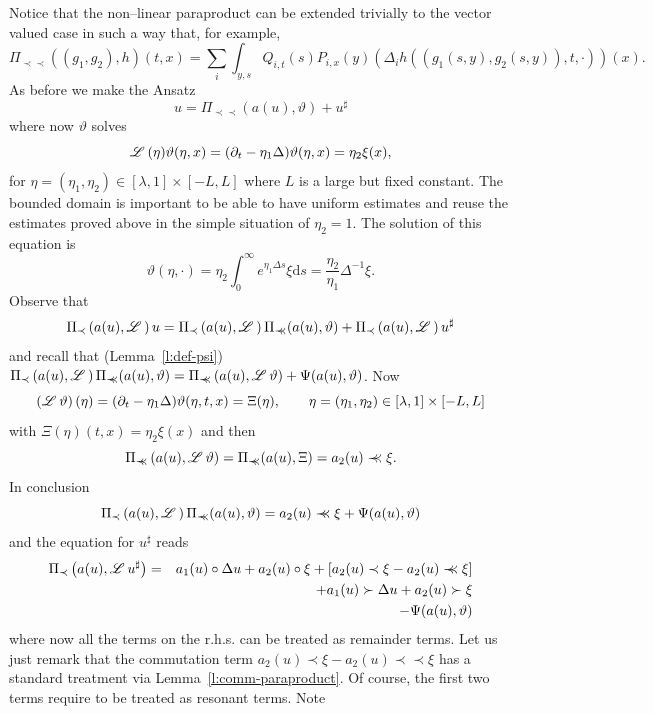 \documentclass[11pt,reqno]{amsart}
\newcommand{\mathd}{\mathrm{d}}
\newcommand{\precprec}{\prec\!\!\!\prec}
\newcommand{\LL}{\mathscr{L} \hspace{.2em}}
\begin{document}
Notice that the non--linear paraproduct can be extended trivially to the
vector valued case in such a way that, for example,
\[ \Pi_{\precprec} ((g_1, g_2), h) (t, x) = \sum_i \int_{y, s} Q_{i, t} (s)
   P_{i, x} (y) (\Delta_i h ((g_1 (s, y), g_2 (s, y)), t, \cdot)) (x) . \]
As before we make the Ansatz
\[ u = \Pi_{\precprec} (a (u), \vartheta) + u^{\sharp} \]
where now $\vartheta$ solves
\[ \LL (\eta) \vartheta (\eta, x) = (\partial_t - \eta_1 \Delta) \vartheta
   (\eta, x) = \eta_2 \xi (x), \]
for $\eta = (\eta_1, \eta_2) \in [\lambda, 1] \times [- L, L]$ where $L$ is a
large but fixed constant. The bounded domain is important to be able to have
uniform estimates and reuse the estimates proved above in the simple situation
of $\eta_2 = 1$. The solution of this equation is
\[ \vartheta (\eta, \cdot) = \eta_2 \int_0^{\infty} e^{\eta_1 \Delta s} \xi
   \mathd s = \frac{\eta_2}{\eta_1} \Delta^{- 1} \xi . \]
Observe that
\[ \Pi_{\prec} \left( a (u), \LL \right) u = \Pi_{\prec} \left( a (u), \LL
   \right) \Pi_{\precprec} (a (u), \vartheta) + \Pi_{\prec} \left( a (u), \LL
   \right) u^{\sharp} \]
and recall that (Lemma~\ref{l:def-psi}) $\Pi_{\prec} \left( a (u), \LL \right)
\Pi_{\precprec} (a (u), \vartheta) = \Pi_{\precprec} \left( a (u), \LL
\vartheta \right) + \Psi (a (u), \vartheta)$. Now
\[ \left( \LL \vartheta \right) (\eta) = (\partial_t - \eta_1 \Delta)
   \vartheta (\eta, t, x) = \Xi (\eta), \qquad \eta = (\eta_1, \eta_2) \in
   [\lambda, 1] \times [- L, L] \]
with $\Xi (\eta) (t, x) = \eta_2 \xi (x)$ and then
\[ \Pi_{\precprec} \left( a (u), \LL \vartheta \right) = \Pi_{\precprec} (a
   (u), \Xi) = a_2 (u) \precprec \xi . \]
In conclusion
\[ \Pi_{\prec} \left( a (u), \LL \right) \Pi_{\precprec} (a (u), \vartheta) =
   a_2 (u) \precprec \xi + \Psi (a (u), \vartheta) \]
and the equation for $u^{\sharp}$ reads
\begin{eqnarray}
  \Pi_{\prec} \left( a (u), \LL u^{\sharp} \right) & = & a_1 (u) \circ \Delta
  u + a_2 (u) \circ \xi + [a_2 (u) \prec \xi - a_2 (u) \precprec \xi]
  \nonumber\\
  &  & + a_1 (u) \succ \Delta u + a_2 (u) \succ \xi \nonumber\\
  &  & - \Psi (a (u), \vartheta) \nonumber
\end{eqnarray}
where now all the terms on the r.h.s. can be treated as remainder terms. Let
us just remark that the commutation term $a_2 (u) \prec \xi - a_2 (u)
\precprec \xi$ has a standard treatment via Lemma~\ref{l:comm-paraproduct}. Of
course, the first two terms require to be treated as resonant terms. Note
\end{document}
